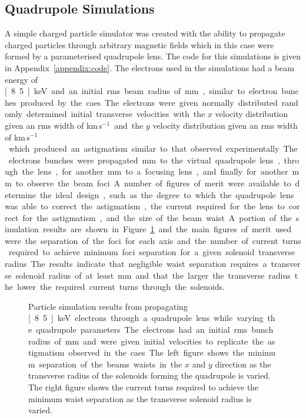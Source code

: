 \subsection{Quadrupole Simulations}

A simple charged particle simulator was created with the ability to propagate charged particles through arbitrary magnetic fields which in this case were formed by a parameterised quadrupole lens.
The code for this simulations is given in Appendix~\ref{appendix:code}.
The electrons used in the simulations had a beam energy of \unit[8.5]{keV} and an initial \gls{rms} beam radius of \unit[5]{mm}, similar to electron bunches produced by the \gls{caes}.
The electrons were given normally distributed randomly determined initial transverse velocities with the $x$ velocity distribution given an \gls{rms} width of \unit[10]{km\,s$^{-1}$} and the $y$ velocity distribution given an \gls{rms} width of \unit[20]{km\,s$^{-1}$} which produced an astigmatism similar to that observed experimentally.
The electrons bunches were propagated \unit[250]{mm} to the virtual quadrupole lens, through the lens, for another \unit[250]{mm} to a focusing lens, and finally for another \unit[500]{mm} to observe the beam foci.
A number of figures of merit were available to determine the ideal design, such as the degree to which the quadrupole lens was able to correct the astigmatism, the current required for the lens to correct for the astigmatism, and the size of the beam waist.

A portion of the simulation results are shown in Figure~\ref{figure:quad_sims} and the main figures of merit used were the separation of the foci for each axis and the number of current turns required to achieve minimum foci separation for a given solenoid transverse radius.
The results indicate that negligible waist separation requires a transverse solenoid radius of at least \unit[35]{mm} and that the larger the transverse radius the lower the required current turns through the solenoids.

\begin{figure}
    \centering
    
    \caption[Quadrupole simulation results.]{Particle simulation results from propagating \unit[8.5]{keV} electrons through a quadrupole lens while varying the quadrupole parameters. The electrons had an initial \gls{rms} bunch radius of \unit[5]{mm} and were given initial velocities to replicate the astigmatism observed in the \gls{caes}. The left figure shows the minimum separation of the beams waists in the $x$ and $y$ direction as the transverse radius of the solenoids forming the quadrupole is varied. The right figure shows the current turns required to achieve the minimum waist separation as the transverse solenoid radius is varied.}
    \label{figure:quad_sims}
\end{figure}

